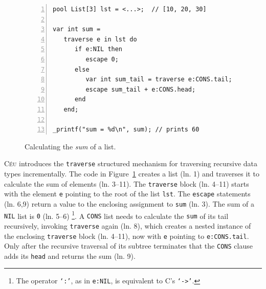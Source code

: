 \documentclass{sig-alternate}
\newcommand{\CEU}{\textsc{C\'{e}u}\xspace}
\newcommand{\code}[1] {{\small{\texttt{#1}}}}
\begin{document}
\begin{figure}[t]
\begin{lstlisting}[numbers=left,xleftmargin=3em]
pool List[3] lst = <...>;  // [10, 20, 30]

var int sum =
   traverse e in lst do
      if e:NIL then
         escape 0;
      else
         var int sum_tail = traverse e:CONS.tail;
         escape sum_tail + e:CONS.head;
      end
   end;

_printf("sum = %d\n", sum); // prints 60
\end{lstlisting}
\caption{
Calculating the \emph{sum} of a list.
\label{lst.list.sum}
}
\end{figure}

\CEU introduces the \code{traverse} structured mechanism for traversing 
recursive data types incrementally.
%
The code in Figure~\ref{lst.list.sum} creates a list (ln. 1) and traverses it 
to calculate the sum of elements (ln. 3--11).
The \code{traverse} block (ln. 4--11) starts with the element \code{e} 
pointing to the root of the list \code{lst}.
The \code{escape} statements (ln. 6,9) return a value to the enclosing 
assignment to \code{sum} (ln. 3).
The sum of a \code{NIL} list is \code{0} (ln. 5--6)%
\footnote{
The operator \code{`:'}, as in \code{e:NIL}, is equivalent to C's \code{`->'}.
}.
A \code{CONS} list needs to calculate the \code{sum} of its tail recursively, 
invoking \code{traverse} again (ln. 8), which creates a nested instance of the 
enclosing \code{traverse} block (ln. 4--11), now with \code{e} pointing to 
\code{e:CONS.tail}.
Only after the recursive traversal of its subtree terminates that the 
\code{CONS} clause adds its \code{head} and returns the sum (ln. 9).
\end{document}

